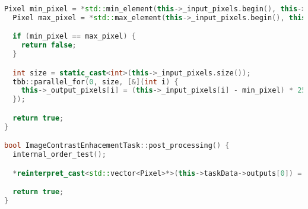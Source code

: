 \documentclass{report}
\begin{document}
\begin{lstlisting}[language=C++,caption=TBB версия]
  Pixel min_pixel = *std::min_element(this->_input_pixels.begin(), this->_input_pixels.end());
  Pixel max_pixel = *std::max_element(this->_input_pixels.begin(), this->_input_pixels.end());

  if (min_pixel == max_pixel) {
    return false;
  }

  int size = static_cast<int>(this->_input_pixels.size());
  tbb::parallel_for(0, size, [&](int i) {
    this->_output_pixels[i] = (this->_input_pixels[i] - min_pixel) * 255 / (max_pixel - min_pixel);
  });

  return true;
}

bool ImageContrastEnhacementTask::post_processing() {
  internal_order_test();

  *reinterpret_cast<std::vector<Pixel>*>(this->taskData->outputs[0]) = this->_output_pixels;

  return true;
}
\end{lstlisting}

\newpage
\end{document}
